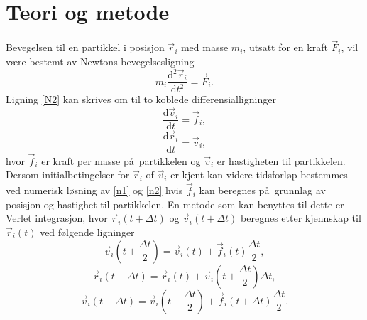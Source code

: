 \documentclass[5p]{elsarticle}        %
\renewenvironment{abstract}{\global\setbox\absbox=\vbox\bgroup
\hsize=\textwidth\def\baselinestretch{1}%
\noindent\unskip\textbf{Sammendrag}
\par\medskip\noindent\unskip\ignorespaces}
{\egroup}
\begin{document}
\section{Teori og metode}
Bevegelsen til en partikkel i posisjon $\vec{r}_i$ med masse $m_i$, utsatt for en kraft $\vec{F}_i$, vil v\ae re bestemt av Newtons bevegelsesligning
\begin{equation}
m_i\frac{\mathrm{d}^2\vec{r}_i}{\mathrm{d}t^2}=\vec{F}_i.
\label{N2}
\end{equation}
Ligning \eqref{N2} kan skrives om til to koblede differensialligninger \cite{prosjektbeskrivelse}
\begin{equation}
\frac{\mathrm{d}\vec{v}_i}{\mathrm{d}t} = \vec{f}_i,
\label{n1}
\end{equation}
\begin{equation}
\frac{\mathrm{d}\vec{r}_i}{\mathrm{d}t}  = \vec{v}_i,
\label{n2}
\end{equation}
hvor $\vec{f}_i$ er kraft per masse p\aa \ partikkelen og $\vec{v}_i$ er hastigheten til partikkelen. Dersom initialbetingelser for $\vec{r}_i$ of $\vec{v}_i$ er kjent kan videre tidsforl\o p bestemmes ved numerisk l\o sning av \eqref{n1} og \eqref{n2} hvis $\vec{f}_i$ kan beregnes p\aa \ grunnlag av posisjon og hastighet til partikkelen. En metode som kan benyttes til dette er Verlet integrasjon, hvor $\vec{r}_i(t + \Delta t)$ og  $\vec{v}_i(t + \Delta t)$ beregnes etter kjennskap til $\vec{r}_i(t)$ ved f\o lgende ligninger\cite{prosjektbeskrivelse}
\begin{equation}
\vec{v}_i(t + \frac{\Delta t}{2}) = \vec{v}_i(t) + \vec{f}_i(t)\frac{\Delta t}{2},
\label{verlet1}
\end{equation}
\begin{equation}
\vec{r}_i(t + \Delta t) = \vec{r}_i(t) + \vec{v}_i(t + \frac{\Delta t}{2})\Delta t,
\end{equation}
\begin{equation}
\vec{v}_i(t + \Delta t) = \vec{v}_i(t + \frac{\Delta t}{2}) + \vec{f}_i(t + \Delta t)\frac{\Delta t}{2}.
\label{verlet2}
\end{equation}
\end{document}
